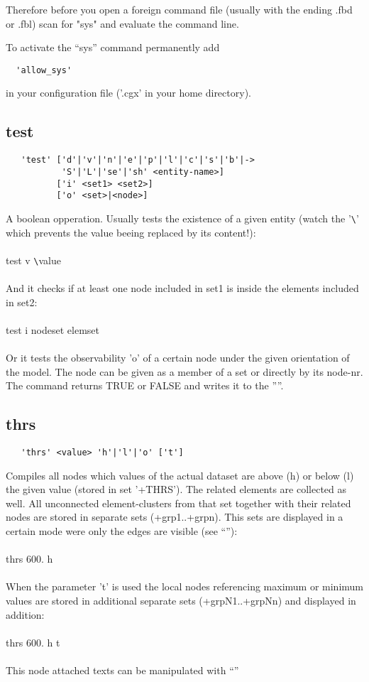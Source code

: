 \documentclass{article}
\begin{document}
Therefore before you open a foreign command file (usually with the ending .fbd or .fbl) scan for "sys" and evaluate the command line.

To activate the ``sys'' command permanently add
\begin{verbatim}
  'allow_sys'
\end{verbatim}
in your configuration file ('.cgx' in your home directory).
 
\subsection{\label{test}test}
\begin{verbatim}
   'test' ['d'|'v'|'n'|'e'|'p'|'l'|'c'|'s'|'b'|->
           'S'|'L'|'se'|'sh' <entity-name>]
          ['i' <set1> <set2>]
          ['o' <set>|<node>]
\end{verbatim}
A boolean opperation. Usually tests the existence of a given entity (watch the '\verb_\_' which prevents the value beeing replaced by its content!):\\\\test v \verb_\_value\\\\And it checks if at least one node included in set1 is inside the elements included in set2:\\\\test i nodeset elemset\\\\Or it tests the observability 'o' of a certain node under the given orientation of the model. The node can be given as a member of a set or directly by its node-nr. The command returns TRUE or FALSE and writes it to the ''''.

\subsection{\label{thrs}thrs}
\begin{verbatim}
   'thrs' <value> 'h'|'l'|'o' ['t']
\end{verbatim}
Compiles all nodes which values of the actual dataset are above (h) or below (l) the given value (stored in set '+THRS'). The related elements are collected as well. All unconnected element-clusters from that set together with their related nodes are stored in separate sets (+grp1..+grpn). This sets are displayed in a certain mode were only the edges are visible (see ``''):\\\\thrs 600. h\\\\
When the parameter 't' is used the local nodes referencing maximum or minimum values are stored in additional separate sets (+grpN1..+grpNn) and displayed in addition:\\\\thrs 600. h t\\\\This node attached texts can be manipulated with ``''
\end{document}
